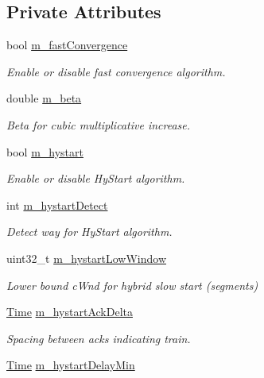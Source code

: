 \subsection*{Private Attributes}
\begin{DoxyCompactItemize}
\item 
bool \hyperlink{classns3_1_1TcpCubic_a90051598ce6276440db0c3b5c0118ebf}{m\+\_\+fast\+Convergence}
\begin{DoxyCompactList}\small\item\em Enable or disable fast convergence algorithm. \end{DoxyCompactList}\item 
double \hyperlink{classns3_1_1TcpCubic_a71879d000e1dcba749c4fae90c8e873d}{m\+\_\+beta}
\begin{DoxyCompactList}\small\item\em Beta for cubic multiplicative increase. \end{DoxyCompactList}\item 
bool \hyperlink{classns3_1_1TcpCubic_a2df1ddb29a2f2a8e1f1886665a92f687}{m\+\_\+hystart}
\begin{DoxyCompactList}\small\item\em Enable or disable Hy\+Start algorithm. \end{DoxyCompactList}\item 
int \hyperlink{classns3_1_1TcpCubic_a34e8c17f1c5c470fa39aa77d6d1bbda5}{m\+\_\+hystart\+Detect}
\begin{DoxyCompactList}\small\item\em Detect way for Hy\+Start algorithm. \end{DoxyCompactList}\item 
uint32\+\_\+t \hyperlink{classns3_1_1TcpCubic_af23b1714553886c496927ba6d75269b4}{m\+\_\+hystart\+Low\+Window}
\begin{DoxyCompactList}\small\item\em Lower bound c\+Wnd for hybrid slow start (segments) \end{DoxyCompactList}\item 
\hyperlink{classns3_1_1Time}{Time} \hyperlink{classns3_1_1TcpCubic_a8aa5da315009dabca1e8136de5e65015}{m\+\_\+hystart\+Ack\+Delta}
\begin{DoxyCompactList}\small\item\em Spacing between ack\textquotesingle{}s indicating train. \end{DoxyCompactList}\item 
\hyperlink{classns3_1_1Time}{Time} \hyperlink{classns3_1_1TcpCubic_a63dffc9a29dc6577a99c4046efcb01f0}{m\+\_\+hystart\+Delay\+Min}

\end{DoxyCompactItemize}
